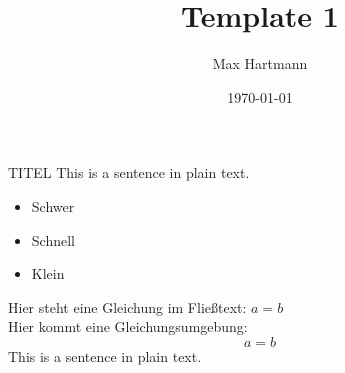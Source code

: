 \documentclass[aspectratio=169]{beamer}
\author{Max Hartmann}
\title{Template 1}
\date{\today}
\begin{document}
\begin{frame}
    \titlepage
\end{frame}

\begin{frame}{TITEL}
This is a sentence in plain text.
\begin{itemize}
    \item Schwer
    \item Schnell
    \item Klein
\end{itemize}
Hier steht eine Gleichung im Fließtext: \(a=b\) \\
Hier kommt eine Gleichungsumgebung:
\begin{equation}
a=b
\end{equation}
This is a sentence in plain text.
\end{frame}
\end{document}

